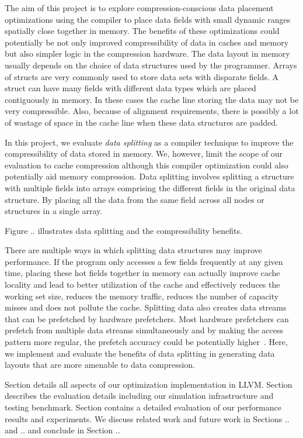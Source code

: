 The aim of this project is  to explore compression-conscious data placement
optimizations using the compiler to place data fields with small dynamic ranges
spatially close together in memory. The benefits of these optimizations could
potentially be not only improved compressibility of data in caches and memory
but also simpler logic in the compression hardware. The data layout in memory
usually depends on the choice of data structures used by the programmer. Arrays
of structs are very commonly used to store data sets with disparate fields. A
struct can have many fields with different data types which are placed
contiguously in memory. In these cases the cache line storing the data may not
be very compressible. Also, because of alignment requirements, there is possibly
a lot of wastage of space in the cache line when these data structures are
padded.  

In this project, we evaluate {\em data splitting}  as a compiler technique to
improve the compressibility of data stored in memory. We, however, limit the
scope of our evaluation to cache compression although this compiler optimization
could also potentially aid memory compression. Data splitting involves splitting
a structure with multiple fields into arrays comprising the different fields in
the original data structure. By placing all the data from the same field across
all nodes or structures in a single array.

Figure .. illustrates data splitting and the compressibility benefits. 

There are multiple ways in which splitting data structures may improve
performance. If the program only accesses a few fields frequently at any given
time, placing these hot fields together in memory can actually improve cache
locality and lead to better utilization of the cache and effectively reduces the
working set size, reduces the memory traffic, reduces the number of capacity
misses and does not pollute the cache. Splitting data also creates data streams
that can be prefetched by hardware prefetchers. Most hardware prefetchers can
prefetch from multiple data streams simultaneously and by making the access
pattern more regular, the prefetch accuracy could be potentially higher~\cite{mpads}.
Here, we implement and evaluate the benefits of data splitting in generating
data layouts that are more amenable to data compression.

Section details all aspects of our optimization implementation in LLVM. Section
describes the evaluation details including our simulation infrastructure and
testing benchmark.  Section contains a detailed evaluation of our performance
results and experiments.  We discuss related work and future work in Sections ..
and .. and conclude in Section ..
